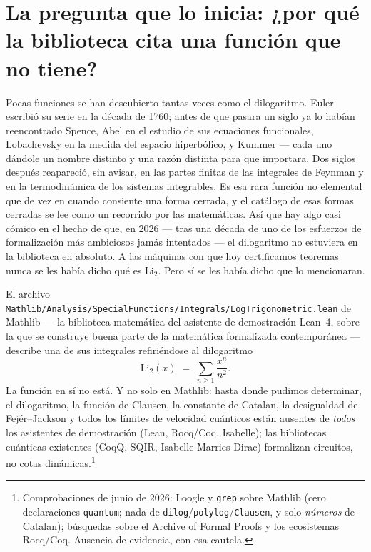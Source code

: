 \documentclass[11pt]{article}
\newcommand{\lean}[1]{\texttt{#1}}
\newcommand{\Li}{\mathrm{Li}_2}
\begin{document}
\section{La pregunta que lo inicia: ¿por qu\'e la biblioteca cita una funci\'on que no
tiene?}\label{sec:intro}

Pocas funciones se han descubierto tantas veces como el dilogaritmo. Euler escribi\'o su
serie en la d\'ecada de 1760; antes de que pasara un siglo ya lo hab\'ian reencontrado
Spence, Abel en el estudio de sus ecuaciones funcionales, Lobachevsky en la medida del
espacio hiperb\'olico, y Kummer --- cada uno d\'andole un nombre distinto y una raz\'on
distinta para que importara. Dos siglos despu\'es reapareci\'o, sin avisar, en las
partes finitas de las integrales de Feynman y en la termodin\'amica de los sistemas
integrables. Es esa rara funci\'on no elemental que de vez en cuando consiente una forma
cerrada, y el cat\'alogo de esas formas cerradas se lee como un recorrido por las
matem\'aticas. As\'i que hay algo casi c\'omico en el hecho de que, en 2026 --- tras una
d\'ecada de uno de los esfuerzos de formalizaci\'on m\'as ambiciosos jam\'as intentados
--- el dilogaritmo no estuviera en la biblioteca en absoluto. A las m\'aquinas con que
hoy certificamos teoremas nunca se les hab\'ia dicho qu\'e es $\Li$. Pero s\'i se les
hab\'ia dicho que lo mencionaran.

El archivo \lean{Mathlib/Analysis/SpecialFunctions/Integrals/LogTrigonometric.lean} de
Mathlib --- la biblioteca matem\'atica del asistente de demostraci\'on Lean~4, sobre la que se
construye buena parte de la matem\'atica formalizada contempor\'anea --- describe una de
sus integrales refiri\'endose al dilogaritmo
\[
\Li(x) \;=\; \sum_{n\ge 1}\frac{x^n}{n^2}.
\]
La funci\'on en s\'i no est\'a. Y no solo en Mathlib: hasta donde pudimos determinar, el
dilogaritmo, la funci\'on de Clausen, la constante de Catalan, la desigualdad de
Fej\'er--Jackson y todos los l\'imites de velocidad cu\'anticos est\'an ausentes de
\emph{todos} los asistentes de demostraci\'on (Lean, Rocq/Coq, Isabelle); las bibliotecas
cu\'anticas existentes (CoqQ, SQIR, Isabelle Marries Dirac) formalizan circuitos, no
cotas din\'amicas.\footnote{Comprobaciones de junio de 2026: Loogle y \lean{grep} sobre
Mathlib (cero declaraciones \lean{quantum}; nada de
\lean{dilog}/\lean{polylog}/\lean{Clausen}, y solo \emph{n\'umeros} de Catalan);
b\'usquedas sobre el Archive of Formal Proofs y los ecosistemas Rocq/Coq. Ausencia de
evidencia, con esa cautela.}
\end{document}
